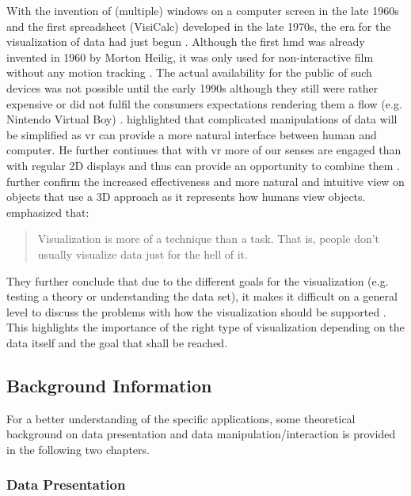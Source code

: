 With the invention of (multiple) windows on a computer screen in the late 1960s and the first spreadsheet (VisiCalc) developed in the late 1970s, the era for the visualization of data had just begun \citep{Myers1998}. Although the first \gls{hmd} was already invented in 1960 by Morton Heilig, it was only used for non-interactive film without any motion tracking \citep{vrs2015}. The actual availability for the public of such devices was not possible until the early 1990s although they still were rather expensive or did not fulfil the consumers expectations rendering them a flow (e.g. Nintendo Virtual Boy) \citep{vrs2015}. \cite{Ribarsky1994} highlighted that complicated manipulations of data will be simplified as \gls{vr} can provide a more natural interface between human and computer. He further continues that with \gls{vr} more of our senses are engaged than with regular 2D displays and thus can provide an opportunity to combine them \citep{Ribarsky1994}. \cite{Jamieson2007} further confirm the increased effectiveness and more natural and intuitive view on objects that use a 3D approach as it represents how humans view objects. \newline
\citet[p.411]{Stone1994} emphasized that: \blockquote{Visualization is more of a technique than a task. That is, people don't usually visualize data just for the hell of it.} They further conclude that due to the different goals for the visualization (e.g. testing a theory or understanding the data set), it makes it difficult on a general level to discuss the problems with how the visualization should be supported \citep{Stone1994}. This highlights the importance of the right type of visualization depending on the data itself and the goal that shall be reached. 



\subsection{Background Information}

For a better understanding of the specific applications, some theoretical background on data presentation and data manipulation/interaction is provided in the following two chapters.


\subsubsection{Data Presentation}


